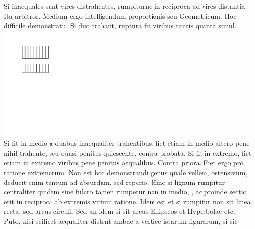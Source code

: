 \pend
\pstart%
Si inaequales sunt vires\protect{} distrahentes, rumpiturne in reciproca ad vires distantia. Ita arbitror. Medium ergo intelligendum proportionis seu Geometricum. Hoc difficile demonstratu.
\pend
\pstart%
Si duo trahant, ruptura\protect{} fit viribus tantis quanta  simul.
\pend
\vspace{1.5em}%
\pstart%
\centering%
\noindent%
\includegraphics[width=0.3\textwidth]{images/lh03705_207r-d1.pdf}\\
\pend
\vspace{1.5em}%
\pstart%
Si fit in medio a duabus inaequaliter trahentibus, fiet etiam in medio altero pene nihil trahente, seu quasi penitus quiescente, contra probata. Si fit in extremo, fiet etiam in extremo viribus pene penitus aequalibus. Contra priora. Fiet ergo pro ratione extremorum.
\pend
\newpage
\pstart
Non est hoc demonstrandi genus quale vellem, ostensivum, deducit enim tantum ad absurdum, sed  reperio.
\pend
\pstart
Hinc si lignum\protect{} rumpitur centraliter quidem sine fulcro tamen rumpetur non in medio, , ac proinde sectio erit in reciproca ab extremis virium ratione\protect{}.
Idem est et si rumpitur non sit linea recta, sed arcus circuli.
Sed an idem si sit arcus Ellipseos\protect{} et Hyperbolae\protect{} etc.
Puto, nisi scilicet aequaliter distent ambae a vertice istarum figurarum, si sic
